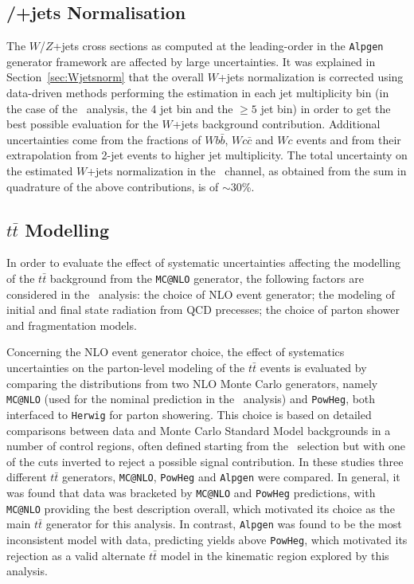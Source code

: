 \subsection{\Wboson/\Zboson+jets Normalisation}
\label{sec:syst_vjetsnormWBX}
The $W$/$Z$+jets cross sections as computed at the
leading-order in the
\texttt{Alpgen} generator framework
are affected by large uncertainties.
It was explained in Section~\ref{sec:Wjetsnorm}
that the overall $W$+jets normalization is 
corrected using data-driven methods 
performing the estimation in each jet multiplicity
bin (in the case of the \wbx\ analysis, the 4 jet bin
and the $\geq 5$ jet bin) in order to get the best
possible evaluation for the $W$+jets background contribution.
Additional uncertainties come from the fractions of $Wb\bar{b}$, $Wc\bar{c}$ and $Wc$
events and from their extrapolation from 2-jet events to higher jet multiplicity. 
The total uncertainty on the estimated $W$+jets normalization
in the \tight\ channel, as obtained from the  sum in quadrature 
of the above contributions, is of $\sim$30\%.



\subsection{$t\bar{t}$ Modelling}
\label{sec:systematic_ttbarmodel}

In order to evaluate the effect of systematic uncertainties 
affecting the modelling of the $t\bar{t}$ background from the
\texttt{MC@NLO} generator, the following factors are considered
in the \wbx\ analysis: the choice of NLO event generator;
the modeling of initial and final state radiation from QCD
precesses; the choice of parton shower and fragmentation models.

Concerning the NLO event generator choice, the effect of 
systematics uncertainties on the parton-level modeling of the
$t\bar{t}$ events is evaluated by comparing the distributions from two 
NLO Monte Carlo generators, namely \texttt{MC@NLO} (used for the nominal 
prediction in the \wbx\ 
analysis) and \texttt{PowHeg}, both interfaced to \texttt{Herwig} for
parton showering.  This choice is based on detailed comparisons
between data and Monte Carlo Standard Model backgrounds in a number 
of control regions, often defined starting from the \loose\ selection 
but with one of the cuts inverted to reject a possible signal contribution. 
In these studies three different $t\bar{t}$ generators, \texttt{MC@NLO}, \texttt{PowHeg} and
\texttt{Alpgen} were compared. In general, it was found that 
data was bracketed by \texttt{MC@NLO} and \texttt{PowHeg} predictions,
with \texttt{MC@NLO} providing the best description overall, which 
motivated its choice as the main $t\bar{t}$ generator for this analysis. 
In contrast, \texttt{Alpgen} was found to be the most inconsistent 
model with data, predicting yields above \texttt{PowHeg}, which 
motivated its rejection
as a valid alternate $t\bar{t}$  model in the kinematic region 
explored by this analysis.

